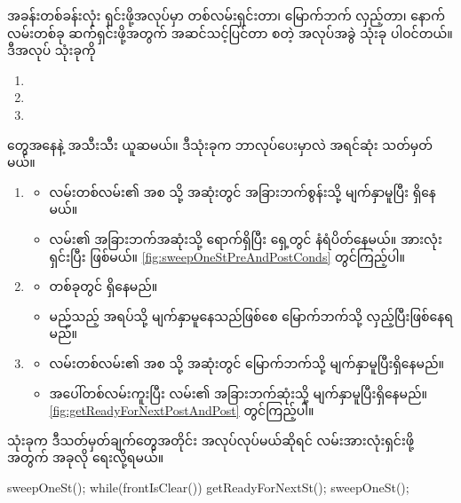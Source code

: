 \begin{sloppypar}
အခန်းတစ်ခန်းလုံး ရှင်းဖို့အလုပ်မှာ တစ်လမ်းရှင်းတာ၊ မြောက်ဘက် လှည့်တာ၊ နောက်လမ်းတစ်ခု ဆက်ရှင်းဖို့အတွက် အဆင်သင့်ပြင်တာ စတဲ့ အလုပ်အခွဲ သုံးခု ပါဝင်တယ်။ ဒီအလုပ် သုံးခုကို
\begin{enumerate}
  \item {}
  \item {}
  \item {}
\end{enumerate}
\mmcommand တွေအနေနဲ့ အသီးသီး ယူဆမယ်။ ဒီသုံးခုက ဘာလုပ်ပေးမှာလဲ အရင်ဆုံး သတ်မှတ်မယ်။ 
\begin{enumerate}
\item {}
\begin{itemize}
\item လမ်းတစ်လမ်း၏ အစ သို့ အဆုံးတွင် အခြားဘက်စွန်းသို့ မျက်နှာမူပြီး ရှိနေမယ်။
\item လမ်း၏ အခြားဘက်အဆုံးသို့ ရောက်ရှိပြီး ရှေ့တွင် နံရံပိတ်နေမယ်။ \mmbeeper အားလုံး ရှင်းပြီး ဖြစ်မယ်။ \Fig \ref{fig:sweepOneStPreAndPostConds} တွင်ကြည့်ပါ။
\end{itemize}
\item {}  
  \begin{itemize}
    \item \mmcorner တစ်ခုတွင် ရှိနေမည်။
    \item မည်သည့် အရပ်သို့ မျက်နှာမူနေသည်ဖြစ်စေ မြောက်ဘက်သို့ လှည့်ပြီးဖြစ်နေရမည်။
  \end{itemize} 
  \item {}
  \begin{itemize}
    \item လမ်းတစ်လမ်း၏ အစ သို့ အဆုံးတွင် မြောက်ဘက်သို့ မျက်နှာမူပြီးရှိနေမည်။
    \item အပေါ်တစ်လမ်းကူးပြီး လမ်း၏ အခြားဘက်ဆုံးသို့ မျက်နှာမူပြီးရှိနေမည်။ \Fig \ref{fig:getReadyForNextPostAndPost} တွင်ကြည့်ပါ။
  \end{itemize}   
\end{enumerate}
\mmcommand သုံးခုက ဒီသတ်မှတ်ချက်တွေအတိုင်း အလုပ်လုပ်မယ်ဆိုရင် လမ်းအားလုံးရှင်းဖို့ အတွက် အခုလို ရေးလို့ရမယ်။ 
\begin{lstcodeminimal}
sweepOneSt();
while(frontIsClear()) {
        getReadyForNextSt();
        sweepOneSt();
}
\end{lstcodeminimal}



\end{sloppypar}
